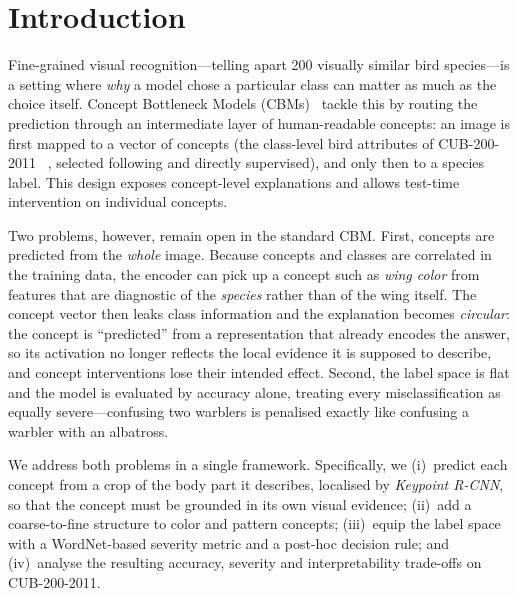 \section{Introduction}
Fine-grained visual recognition---telling apart 200 visually similar bird
species---is a setting where \emph{why} a model chose a particular class can
matter as much as the choice itself. Concept Bottleneck Models
(CBMs)~\cite{koh2020concept} tackle this by routing the prediction through an
intermediate layer of human-readable concepts: an image is first mapped to a
vector of concepts (the class-level bird attributes of CUB-200-2011%
~\cite{wah2011caltech}, selected following \citet{koh2020concept} and directly
supervised), and only then to a species label. This design exposes concept-level
explanations and allows test-time intervention on individual concepts.

Two problems, however, remain open in the standard CBM. First, concepts are
predicted from the \emph{whole} image. Because concepts and classes are
correlated in the training data, the encoder can pick up a concept such as
\emph{wing color} from features that are diagnostic of the \emph{species} rather
than of the wing itself. The concept vector then leaks class information and the
explanation becomes \emph{circular}: the concept is ``predicted'' from a
representation that already encodes the answer, so its activation no longer
reflects the local evidence it is supposed to describe, and concept interventions
lose their intended effect. Second, the label space is flat and the model is
evaluated by accuracy alone, treating every misclassification as equally
severe---confusing two warblers is penalised exactly like confusing a warbler
with an albatross.

We address both problems in a single framework. Specifically, we (i)~predict
each concept from a crop of the body part it describes, localised by
\emph{Keypoint R-CNN}, so that the concept must be grounded in its own visual
evidence; (ii)~add a coarse-to-fine structure to color and pattern concepts;
(iii)~equip the label space with a WordNet-based severity metric and a post-hoc
decision rule; and (iv)~analyse the resulting accuracy, severity and
interpretability trade-offs on CUB-200-2011.
